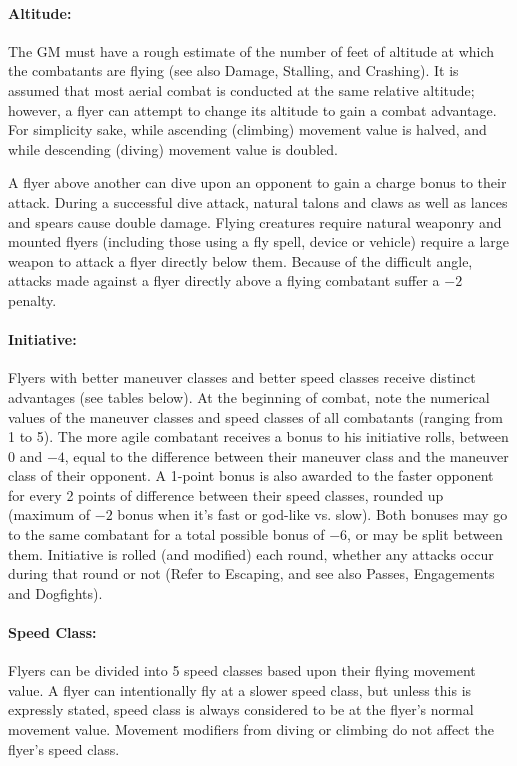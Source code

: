 \begin{multicols}{2}
\paragraph{Altitude:} The GM must have a rough estimate of the number of feet of altitude at which the combatants are flying (see also Damage, Stalling, and Crashing).  It is assumed that most aerial combat is conducted at the same relative altitude; however, a flyer can attempt to change its altitude to gain a combat advantage.  For simplicity sake, while ascending (climbing) movement value is halved, and while descending (diving) movement value is doubled.  

A flyer above another can dive upon an opponent to gain a charge bonus to their attack.  During a successful dive attack, natural talons and claws as well as lances and spears cause double damage.  Flying creatures require natural weaponry and mounted flyers (including those using a fly spell, device or vehicle) require a large weapon to attack a flyer directly below them.  Because of the difficult angle, attacks made against a flyer directly above a flying combatant suffer a $-2$ penalty.

\paragraph{Initiative:} Flyers with better maneuver classes and better speed classes receive distinct advantages (see tables below).  At the beginning of combat, note the numerical values of the maneuver classes and speed classes of all combatants (ranging from 1 to 5).  The more agile combatant receives a bonus to his initiative rolls, between 0 and $-4$, equal to the difference between their maneuver class and the maneuver class of their opponent.  A 1-point bonus is also awarded to the faster opponent for every 2 points of difference between their speed classes, rounded up (maximum of $-2$ bonus when it's fast or god-like vs. slow).  Both bonuses may go to the same combatant for a total possible bonus of $-6$, or may be split between them.  Initiative is rolled (and modified) each round, whether any attacks occur during that round or not (Refer to Escaping, and see also Passes, Engagements and Dogfights).

\paragraph{Speed Class:} Flyers can be divided into 5 speed classes based upon their flying movement value.  A flyer can intentionally fly at a slower speed class, but unless this is expressly stated, speed class is always considered to be at the flyer's normal movement value.  Movement modifiers from diving or climbing do not affect the flyer's speed class.


\end{multicols}

